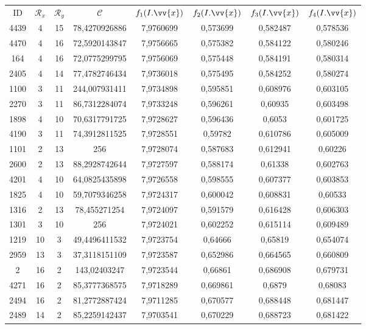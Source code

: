 \scriptsize
\begin{longtable}{|c|c|c|c|c|c|c|c|}
\hline
ID & $\mathscr{R}_x$ & $\mathscr{R}_y$ & $\mathscr{C}$ & $f_1(I.\vv{x})$ & $f_2(I.\vv{x})$ & $f_3(I.\vv{x})$ & $f_4(I.\vv{x})$ \\
4439 & 4 & 15 & 78,4270926886 & 7,9760699 & 0,573699 & 0,582487 & 0,578536 \\
4470 & 4 & 16 & 72,5920143847 & 7,9756665 & 0,575382 & 0,584122 & 0,580246 \\
164 & 4 & 16 & 72,0775299795 & 7,9756069 & 0,575448 & 0,584191 & 0,580314 \\
2405 & 4 & 14 & 77,4782746434 & 7,9736018 & 0,575495 & 0,584252 & 0,580274 \\
1100 & 3 & 11 & 244,007931411 & 7,9734898 & 0,595851 & 0,608976 & 0,603105 \\
2270 & 3 & 11 & 86,7312284074 & 7,9733248 & 0,596261 & 0,60935 & 0,603498 \\
1898 & 4 & 10 & 70,6317791725 & 7,9728627 & 0,596436 & 0,6053 & 0,601725 \\
4190 & 3 & 11 & 74,3912811525 & 7,9728551 & 0,59782 & 0,610786 & 0,605009 \\
1101 & 2 & 13 & 256 & 7,9728074 & 0,587683 & 0,612941 & 0,60226 \\
2600 & 2 & 13 & 88,2928742644 & 7,9727597 & 0,588174 & 0,61338 & 0,602763 \\
4201 & 4 & 10 & 64,0825435898 & 7,9726558 & 0,598555 & 0,607377 & 0,603853 \\
1825 & 4 & 10 & 59,7079346258 & 7,9724317 & 0,600042 & 0,608831 & 0,60533 \\
1316 & 2 & 13 & 78,455271254 & 7,9724097 & 0,591579 & 0,616428 & 0,606303 \\
1301 & 3 & 10 & 256 & 7,9724021 & 0,602252 & 0,615114 & 0,609489 \\
1219 & 10 & 3 & 49,4496411532 & 7,9723754 & 0,64666 & 0,65819 & 0,654074 \\
2959 & 13 & 3 & 37,3118151109 & 7,9723587 & 0,652986 & 0,664565 & 0,660809 \\
2 & 16 & 2 & 143,02403247 & 7,9723544 & 0,66861 & 0,686908 & 0,679731 \\
4271 & 16 & 2 & 85,3777368575 & 7,9718289 & 0,669861 & 0,6879 & 0,68083 \\
2494 & 16 & 2 & 81,2772887424 & 7,9711285 & 0,670577 & 0,688448 & 0,681447 \\
2489 & 14 & 2 & 85,2259142437 & 7,9703541 & 0,670229 & 0,688723 & 0,681422 \\

\end{longtable}
